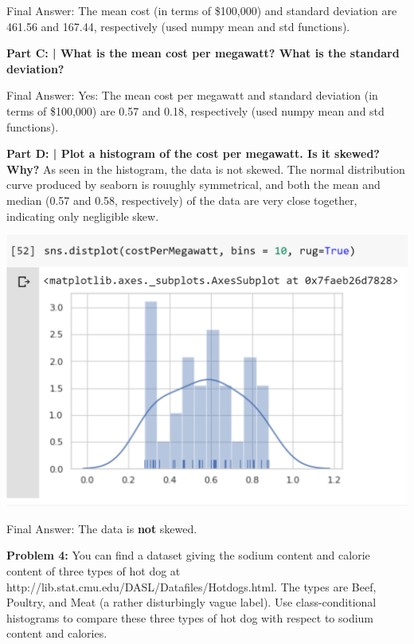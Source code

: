 \documentclass{article}
\begin{document}
 Final Answer: The mean cost (in terms of \$100,000) and standard deviation are 461.56 and 167.44, respectively (used numpy mean and std functions).\newline
 
 \textbf{Part C: | What is the mean cost per megawatt? What is the standard deviation?}\newline
 
 Final Answer: Yes: The mean cost per megawatt and standard deviation (in terms of \$100,000) are 0.57  and 0.18, respectively (used numpy mean and std functions).\newline
 
 \textbf{Part D: | Plot a histogram of the cost per megawatt. Is it skewed? Why?}\newline\newline
 As seen in the histogram, the data is not skewed. The normal distribution curve produced by seaborn is rouughly symmetrical, and both the mean and median (0.57 and 0.58, respectively) of the data are very close together, indicating only negligible skew. \newline
 
 \includegraphics{HW1_2.PNG}
 
 Final Answer: The data is \textbf{not} skewed. \newline
 
 \newpage
 
 \begin{center}
      \Large\textbf{Problem 4:} You can find a dataset giving the sodium content and calorie content of three types of hot dog at http://lib.stat.cmu.edu/DASL/Datafiles/Hotdogs.html. The types are Beef, Poultry, and Meat (a rather disturbingly vague label). Use class-conditional histograms to compare these three types of hot dog with respect to sodium content and calories.\par
 \end{center}
\end{document}
